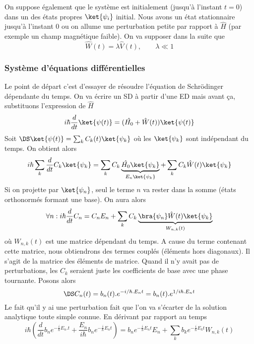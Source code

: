 		
		On suppose également que le système est initialement (jusqu'à l'instant $t=0$) dans un 
		des états propres $\ket{\psi_i}$ initial. Nous avons un état stationnaire jusqu'à 
		l'instant 0 ou on allume une perturbation petite par rapport à $\hat H$ (par exemple un 
		champ magnétique faible). On va supposer dans la suite que
		\begin{equation}
		\hat{W}(t) = \lambda \hat{V}(t),\qquad \lambda \ll 1
		\end{equation}

		\subsubsection{Système d'équations différentielles}
		Le point de départ c'est d'essayer de résoudre l'équation 	de Schrödinger dépendante du temps. 
		On va écrire un SD à partir d'une ED mais avant ça, substituons l'expression de $\hat{H}$
		\begin{equation}
		i\hbar\frac{d}{dt}\ket{\psi(t)} = (\hat{H_0}+\hat{W}(t))\ket{\psi(t)}
		\end{equation}
		Soit $\DS \ket{\psi(t)} = \sum_k C_k(t)\ket{\psi_k}$ où les $\ket{\psi_k}$ sont indépendant
		du temps. On obtient alors
		\begin{equation}
		i\hbar \sum_k \dfrac{d}{dt}C_k\ket{\psi_k} = \sum_k C_k\underbrace{\hat{H_0}\ket{\psi_k}}_{
		E_n\ket{\psi_k}} + \sum_k C_k\hat{W}(t)\ket{\psi_k}
		\end{equation}
		Si on projette par $\ket{\psi_n}$, seul le terme $n$ va rester dans la somme (états orthonormés 
		formant une	base). On aura alors
		\begin{equation}
		\forall n : i\hbar \dfrac{d}{dt}C_n = C_n E_n + \sum_k C_k \underbrace{
		\bra{\psi_n}\hat{W}(t)\ket{\psi_k}}_{W_{n,k}(t)}
		\end{equation}
		où $W_{n,k}(t)$ est une matrice dépendant du temps. A cause du terme contenant cette matrice, 
		nous obtiendrons des termes couplés (éléments hors diagonaux). Il s'agit de la matrice des 
		éléments de matrice. Quand il n'y avait pas de perturbations, les $C_k$ seraient juste les 
		coefficients de base avec une phase tournante. Posons alors 
		\begin{equation}
		\DS C_n(t) = b_n(t).e^{-i/\hbar.E_nt}= b_n(t).e^{1/i\hbar.E_nt}
		\end{equation}
		Le fait qu'il y ai une 	perturbation fait que l'on va s'écarter de la solution analytique 
		toute simple connue. En dérivant par rapport au temps
		\begin{equation}
		i\hbar\left(\dfrac{d}{dt}b_ne^{-\frac{i}{\hbar}E_n.t} + \dfrac{E_n}{i\hbar}b_ne^{-\frac{i}
		{\hbar}E_nt}\right) = b_ne^{-\frac{i}{\hbar}E_nt}E_n+ \sum_k b_k e^{-\frac{i}{\hbar}E_kt}W_{n,k}(t)
		\end{equation}
